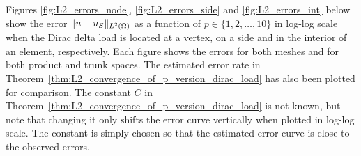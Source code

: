 \documentclass[english, 12pt, a4paper, sci, utf8, a-2b, online]{aaltothesis}
\theoremstyle{definition}
\theoremstyle{plain}
\DeclarePairedDelimiter\norm{\lVert}{\rVert}
\numberwithin{equation}{section}
\begin{document}
Figures \ref{fig:L2_errors_node}, \ref{fig:L2_errors_side} and \ref{fig:L2_errors_int} below
show the error $\norm{u - u_S}_{L^2(\Omega)}$ as a function of $p \in \{ 1,2,\dotsc,10 \}$
in log-log scale when the Dirac delta load is located at a vertex, on a side and
in the interior of an element, respectively. Each figure shows the errors for both meshes
and for both product and trunk spaces.
The estimated error rate in Theorem~\ref{thm:L2_convergence_of_p_version_dirac_load}
has also been plotted for comparison.
The constant $C$ in Theorem~\ref{thm:L2_convergence_of_p_version_dirac_load}
is not known, but note that changing it only shifts the error curve
vertically when plotted in log-log scale. The constant is simply chosen so that
the estimated error curve is close to the observed errors.

\begin{figure}[b]
    \centering
    \begin{subfigure}[t]{0.475\textwidth}
        \centering
\end{subfigure}
\end{figure}
\end{document}
